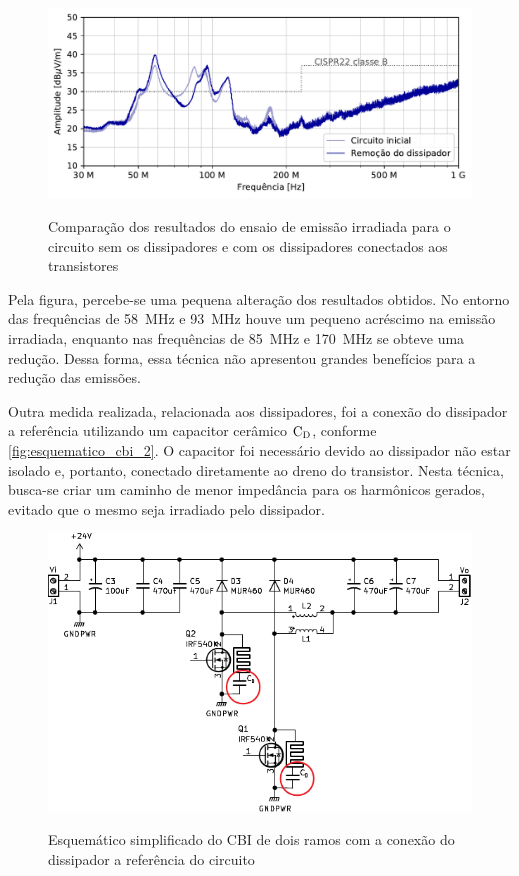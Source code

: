     \begin{figure}[H]
    	\centering
    	\caption{Comparação dos resultados do ensaio de emissão irradiada para o circuito sem os dissipadores e com os dissipadores conectados aos transistores}
    	\includegraphics[scale=.9]{pdf/rad/Remoção do dissipador.pdf}
    	\label{fig:med_rad_remv_dissip}
    \end{figure}
    
    Pela figura, percebe-se uma pequena alteração dos resultados obtidos. No entorno das frequências de \SI{58}{\mega\hertz} e \SI{93}{\mega\hertz} houve um pequeno acréscimo na emissão irradiada, enquanto nas frequências de \SI{85}{\mega\hertz} e \SI{170}{\mega\hertz} se obteve uma redução. Dessa forma, essa técnica não apresentou grandes benefícios para a redução das emissões. 
    
    Outra medida realizada, relacionada aos dissipadores, foi a conexão do dissipador a referência utilizando um capacitor cerâmico $\text{C}_\text{D}$, conforme \autoref{fig:esquematico_cbi_2}. O capacitor foi necessário devido ao dissipador não estar isolado e, portanto, conectado diretamente ao dreno do transistor. Nesta técnica, busca-se criar um caminho de menor impedância para os harmônicos gerados, evitado que o mesmo seja irradiado pelo dissipador. 
    
    \begin{figure}[H]
    	\centering
    	\caption{Esquemático simplificado do CBI de dois ramos com a conexão do dissipador a referência do circuito}
    	\includegraphics[scale=1.2]{pdf/layout/Esquematico_CBI_dissipador2.pdf}
        \label{fig:esquematico_cbi_2}
    \end{figure}
    
